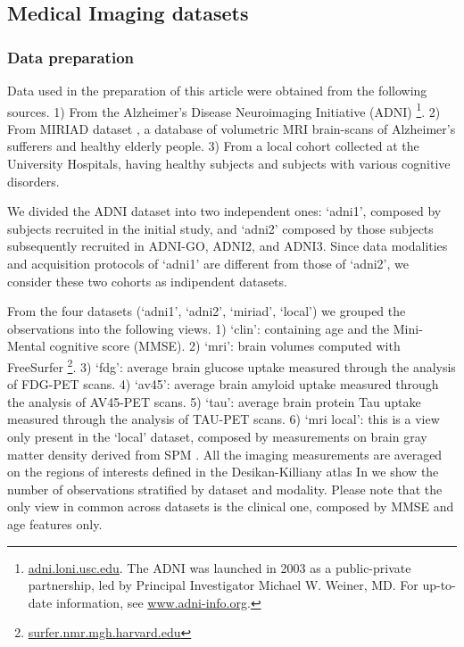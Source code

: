 \subsection{Medical Imaging datasets}
\label{ssec:real}

\newpage

% 
% 



% 

\subsubsection{Data preparation}
Data used in the preparation of this article were obtained from the following sources.
1) From the Alzheimer's Disease Neuroimaging Initiative (ADNI)
\footnote{
\href{http://adni.loni.usc.edu}{adni.loni.usc.edu}. The ADNI was launched in 2003 as a public-private partnership, led by Principal Investigator Michael W. Weiner, MD. For up-to-date information, see \href{www.adni-info.org}{www.adni-info.org}.
}.
2) From MIRIAD dataset \cite{Miriad}, a database of volumetric MRI brain-scans of Alzheimer's sufferers and healthy elderly people.
3) From a local cohort collected at the University Hospitals, having healthy subjects and subjects with various cognitive disorders.

We divided the ADNI dataset into two independent ones:
`adni1', composed by subjects recruited in the initial study,
and `adni2' composed by those subjects subsequently recruited in ADNI-GO, ADNI2, and ADNI3.
Since data modalities and acquisition protocols of `adni1' are different from those of `adni2', we consider these two cohorts as indipendent datasets.

From the four datasets (`adni1', `adni2', `miriad', `local') we grouped the observations into the following views.
1) `clin': containing age and the Mini-Mental cognitive score (MMSE).
2) `mri': brain volumes computed with FreeSurfer \footnote{
\href{https://surfer.nmr.mgh.harvard.edu/}{surfer.nmr.mgh.harvard.edu}
}.
3) `fdg': average brain glucose uptake measured through the analysis of FDG-PET scans.
4) `av45': average brain amyloid uptake measured through the analysis of AV45-PET scans.
5) `tau': average brain protein Tau uptake measured through the analysis of TAU-PET scans.
6) `mri local': this is a view only present in the `local' dataset, composed by measurements on brain gray matter density derived from SPM \cite{Ashburner2000}.
All the imaging measurements are averaged on the regions of interests defined in the Desikan-Killiany atlas \cite{Desikan2006}
In  we show the number of observations stratified by dataset and modality.
Please note that the only view in common across datasets is the clinical one, composed by MMSE and age features only.

